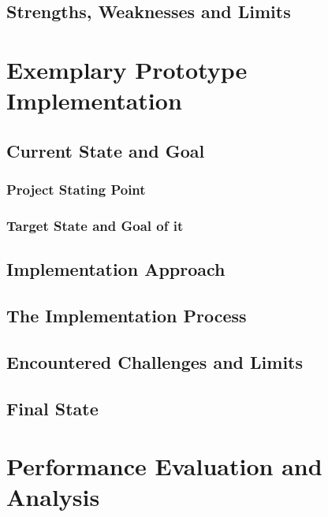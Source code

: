 \documentclass[12pt, a4paper]{article}
\begin{document}
    \subsection{Strengths, Weaknesses and Limits}\label{ssec::limits}
    \newpage

\section{Exemplary Prototype Implementation}\label{sec::solution_code}
    
    \subsection{Current State and Goal}
        \subsubsection{Project Stating Point}
        \subsubsection{Target State and Goal of it}
    \subsection{Implementation Approach}\label{ssec::imp_approach}
    \subsection{The Implementation Process}\label{ssec::imp_process}
    \subsection{Encountered Challenges and Limits}
    \subsection{Final State} \label{sec::final}


\section{Performance Evaluation and Analysis}\label{sec::eval}
\end{document}
